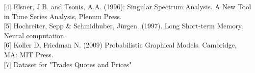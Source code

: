 \documentclass{article}
\begin{document}
[4] Elsner, J.B. and Tsonis, A.A. (1996): Singular Spectrum Analysis. A New Tool in Time Series Analysis, Plenum Press. \\

[5] Hochreiter, Sepp & Schmidhuber, Jürgen. (1997). Long Short-term Memory. Neural computation. \\

[6] Koller D, Friedman N. (2009) Probabilistic Graphical Models. Cambridge, MA: MIT Press. \\

[7] Dataset for "Trades Quotes and Prices" \\














\end{document}
